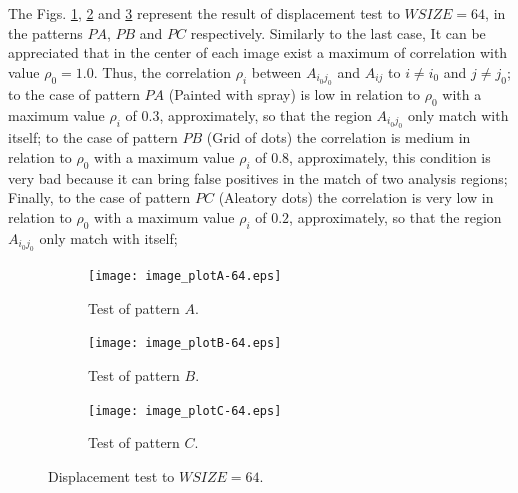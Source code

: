 The Figs. \ref{fig:choosingA64}, \ref{fig:choosingB64} and \ref{fig:choosingC64}
represent the result of displacement test to $WSIZE=64$, 
in the patterns $PA$, $PB$ and $PC$ respectively. Similarly to the last case,
It can be appreciated that in the center of each image exist a maximum of correlation
with value $\rho_0=1.0$. Thus,
the correlation $\rho_i$ between $A_{i_0 j_0}$ and $A_{ij}$ to $i\neq i_0$ and  $j\neq j_0$;
to the case of pattern $PA$ (Painted with spray) is low in relation to $\rho_0$
with a maximum value $\rho_i$ of $0.3$, approximately, 
so that the region $A_{i_0 j_0}$ only match with itself;
to the case of pattern $PB$ (Grid of dots) the correlation is medium in relation to $\rho_0$
with a maximum value $\rho_i$ of $0.8$, approximately, this condition is 
very bad because it can bring false positives in the match of two analysis regions; Finally,
to the case of pattern $PC$ (Aleatory dots) the correlation is very low in relation to $\rho_0$
with a maximum value $\rho_i$ of $0.2$, approximately, 
so that the region $A_{i_0 j_0}$ only match with itself;
\begin{figure}[H]
\centering
  \begin{subfigure}[b]{0.45\textwidth}
    \texttt{[image: image\_plotA-64.eps]}
    \vspace{2pt}
    \caption{Test of pattern $A$.}
    \label{fig:choosingA64}
  \end{subfigure}
  \begin{subfigure}[b]{0.45\textwidth}
    \texttt{[image: image\_plotB-64.eps]}
    \vspace{2pt}
    \caption{Test of pattern $B$.}
    \label{fig:choosingB64}
  \end{subfigure}
  \begin{subfigure}[b]{0.45\textwidth}
    \texttt{[image: image\_plotC-64.eps]}
    \vspace{2pt}
    \caption{Test of pattern $C$.}
    \label{fig:choosingC64}
  \end{subfigure}
  \caption{Displacement test to $WSIZE=64$.}
  \label{fig:choosingAll64}
\end{figure}

